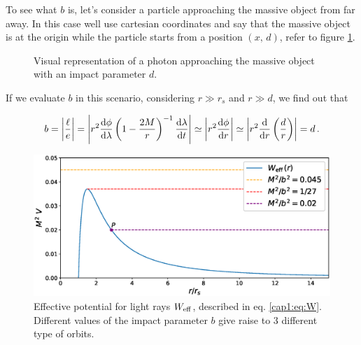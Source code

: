 To see what $b$ is, let's consider a particle approaching the massive object from
far away. In this case well use cartesian coordinates and say that the massive
object is at the origin while the particle starts from a position $(x, \, d)$,
refer to figure \ref{cap1:fig:b}.

\begin{figure}[h]
\centering
{}
\caption{Visual representation of a photon approaching the massive object
with an impact parameter $d$.}
\label{cap1:fig:b}
\end{figure}

If we evaluate $b$ in this scenario, considering $r \gg r_s$ and $r \gg d$, we
find out that

\begin{equation*}
    b = \abs{\frac{\ell}{e}}
    = \abs{r^2 \dv{\phi}{\lambda} \left(1-\frac{2M}{r}\right)^{-1}\dv{\lambda}{t}}
    \simeq \abs{r^2 \dv{\phi}{r}}
    \simeq \abs{r^2 \dv{}{r} \left(\frac{d}{r}\right)}
    = d \, . 
\end{equation*}
\begin{figure}[h!]
    \centering
    \includegraphics[width = 0.8 \textwidth]{Figures/W_eff_vs_b.eps}
    \caption{Effective potential for light rays $W_{\rm eff}$, described in eq.
        \ref{cap1:eq:W}.
        Different values of the impact parameter $b$ give raise to 3 different
        type of orbits.}
    \label{ca1:fig:W_eff_orbits}
\end{figure}

